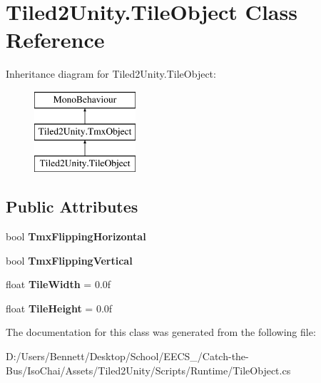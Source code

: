\hypertarget{class_tiled2_unity_1_1_tile_object}{}\section{Tiled2\+Unity.\+Tile\+Object Class Reference}
\label{class_tiled2_unity_1_1_tile_object}
Inheritance diagram for Tiled2\+Unity.\+Tile\+Object\+:\begin{figure}[H]
\begin{center}
\leavevmode
\includegraphics[height=3.000000cm]{class_tiled2_unity_1_1_tile_object}
\end{center}
\end{figure}
\subsection*{Public Attributes}
\begin{DoxyCompactItemize}
\item 
\mbox{\label{class_tiled2_unity_1_1_tile_object_abafd4afef3f59c65ca1bc370ce1af9f7}} 
bool {\bfseries Tmx\+Flipping\+Horizontal}
\item 
\mbox{\label{class_tiled2_unity_1_1_tile_object_a90fdfe12d49c2e7bc900d3ad73a5f0da}} 
bool {\bfseries Tmx\+Flipping\+Vertical}
\item 
\mbox{\label{class_tiled2_unity_1_1_tile_object_af124dfbce4dee89e7d41ab53fc7a3a23}} 
float {\bfseries Tile\+Width} = 0.\+0f
\item 
\mbox{\label{class_tiled2_unity_1_1_tile_object_a03f3f899c6efc1fa8f79f377fcfa12bd}} 
float {\bfseries Tile\+Height} = 0.\+0f
\end{DoxyCompactItemize}


The documentation for this class was generated from the following file\+:\begin{DoxyCompactItemize}
\item 
D\+:/\+Users/\+Bennett/\+Desktop/\+School/\+E\+E\+C\+S\+\_/\+Catch-\/the-\/\+Bus/\+Iso\+Chai/\+Assets/\+Tiled2\+Unity/\+Scripts/\+Runtime/Tile\+Object.\+cs\end{DoxyCompactItemize}
